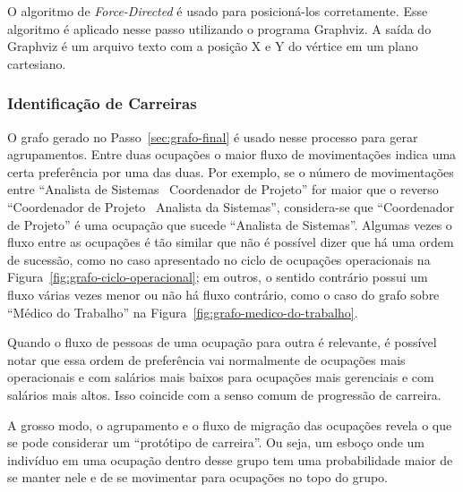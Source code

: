 \documentclass[12pt,a4paper]{article}
\begin{document}
O algoritmo de \textit{Force-Directed} é usado para posicioná-los corretamente. Esse algoritmo é aplicado nesse passo utilizando o programa Graphviz. A saída do Graphviz é um arquivo texto com a posição X e Y do vértice em um plano cartesiano.

\subsubsection{Identificação de Carreiras}



O grafo gerado no Passo~\ref{sec:grafo-final} é usado nesse processo para gerar agrupamentos. Entre duas ocupações o maior fluxo de movimentações indica uma certa preferência por uma das duas. Por exemplo, se o número de movimentações entre \enquote{Analista de Sistemas \textrightarrow~Coordenador de Projeto} for maior que o reverso \enquote{Coordenador de Projeto \textrightarrow~Analista da Sistemas}, considera-se que \enquote{Coordenador de Projeto} é uma ocupação que sucede \enquote{Analista de Sistemas}. Algumas vezes o fluxo entre as ocupações é tão similar que não é possível dizer que há uma ordem de sucessão, como no caso apresentado no ciclo de ocupações operacionais na Figura~\ref{fig:grafo-ciclo-operacional}; em outros, o sentido contrário possui um fluxo várias vezes menor ou não há fluxo contrário, como o caso do grafo sobre \enquote{Médico do Trabalho} na Figura~\ref{fig:grafo-medico-do-trabalho}.


Quando o fluxo de pessoas de uma ocupação para outra é relevante, é possível notar que essa ordem de preferência vai normalmente de ocupações mais operacionais e com salários mais baixos para ocupações mais gerenciais e com salários mais altos. Isso coincide com a senso comum de progressão de carreira.

A grosso modo, o agrupamento e o fluxo de migração das ocupações revela o que se pode considerar um \enquote{protótipo de carreira}. Ou seja, um esboço onde um indivíduo em uma ocupação dentro desse grupo tem uma probabilidade maior de se manter nele e de se movimentar para ocupações no topo do grupo.
\end{document}
